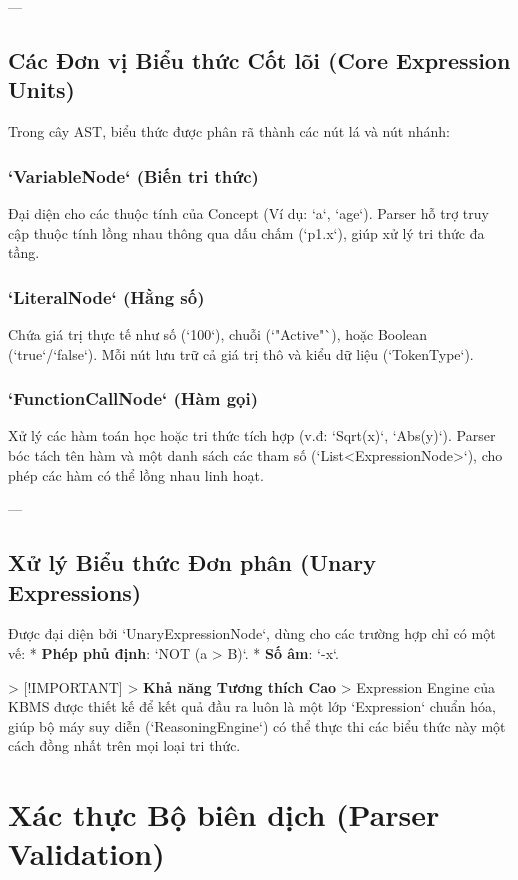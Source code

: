 ---

\subsection{Các Đơn vị Biểu thức Cốt lõi (Core Expression Units)}

Trong cây AST, biểu thức được phân rã thành các nút lá và nút nhánh:

\subsubsection{`VariableNode` (Biến tri thức)}
Đại diện cho các thuộc tính của Concept (Ví dụ: `a`, `age`). Parser hỗ trợ truy cập thuộc tính lồng nhau thông qua dấu chấm (`p1.x`), giúp xử lý tri thức đa tầng.

\subsubsection{`LiteralNode` (Hằng số)}
Chứa giá trị thực tế như số (`100`), chuỗi (`"Active"`), hoặc Boolean (`true`/`false`). Mỗi nút lưu trữ cả giá trị thô và kiểu dữ liệu (`TokenType`).

\subsubsection{`FunctionCallNode` (Hàm gọi)}
Xử lý các hàm toán học hoặc tri thức tích hợp (v.đ: `Sqrt(x)`, `Abs(y)`). Parser bóc tách tên hàm và một danh sách các tham số (`List<ExpressionNode>`), cho phép các hàm có thể lồng nhau linh hoạt.

---

\subsection{Xử lý Biểu thức Đơn phân (Unary Expressions)}

Được đại diện bởi `UnaryExpressionNode`, dùng cho các trường hợp chỉ có một vế:
*   \textbf{Phép phủ định}: `NOT (a > B)`.
*   \textbf{Số âm}: `-x`.

> [!IMPORTANT]
> \textbf{Khả năng Tương thích Cao}
> Expression Engine của KBMS được thiết kế để kết quả đầu ra luôn là một lớp `Expression` chuẩn hóa, giúp bộ máy suy diễn (`ReasoningEngine`) có thể thực thi các biểu thức này một cách đồng nhất trên mọi loại tri thức. 🧪

\section{Xác thực Bộ biên dịch (Parser Validation)}


